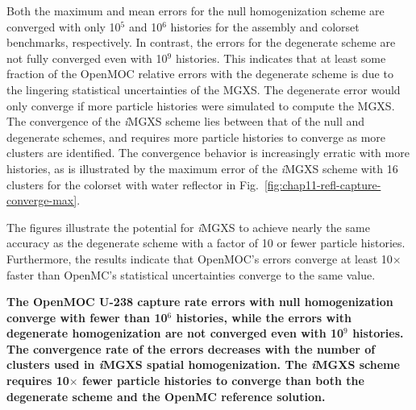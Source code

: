 Both the maximum and mean errors for the null homogenization scheme are converged with only 10$^{5}$ and 10$^{6}$ histories for the assembly and colorset benchmarks, respectively. In contrast, the errors for the degenerate scheme are not fully converged even with 10$^{9}$ histories. This indicates that at least some fraction of the OpenMOC relative errors with the degenerate scheme is due to the lingering statistical uncertainties of the \ac{MGXS}. The degenerate error would only converge if more particle histories were simulated to compute the \ac{MGXS}. The convergence of the \textit{i}\ac{MGXS} scheme lies between that of the null and degenerate schemes, and requires more particle histories to converge as more clusters are identified. The convergence behavior is increasingly erratic with more histories, as is illustrated by the maximum error of the \textit{i}\ac{MGXS} scheme with 16 clusters for the colorset with water reflector in Fig.~\ref{fig:chap11-refl-capture-converge-max}.
 

The figures illustrate the potential for \textit{i}\ac{MGXS} to achieve nearly the same accuracy as the degenerate scheme with a factor of 10 or fewer particle histories. Furthermore, the results indicate that OpenMOC's errors converge at least 10$\times$ faster than OpenMC's statistical uncertainties converge to the same value.

\begin{emphbox}
\textbf{The OpenMOC U-238 capture rate errors with null homogenization converge with fewer than 10$^{6}$ histories, while the errors with degenerate homogenization are not converged even with 10$^{9}$ histories. The convergence rate of the errors decreases with the number of clusters used in \textit{i}\ac{MGXS} spatial homogenization. The \textit{i}\ac{MGXS} scheme requires 10$\times$ fewer particle histories to converge than both the degenerate scheme and the OpenMC reference solution.}
\end{emphbox}


